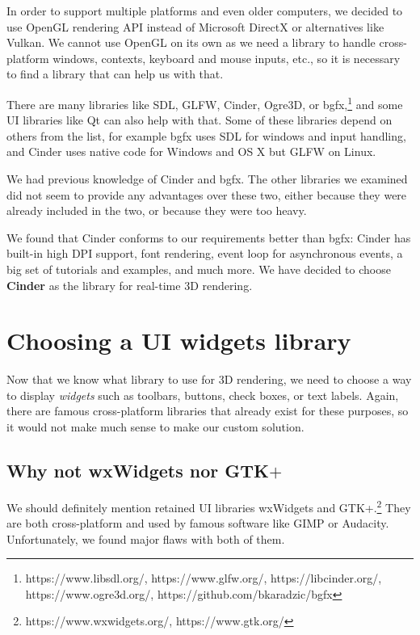 \medskip

In order to support multiple platforms and even older computers, we decided to use OpenGL rendering API instead of Microsoft DirectX or alternatives like Vulkan.
We cannot use OpenGL on its own as we need a library to handle cross-platform windows, contexts, keyboard and mouse inputs, etc., so it is necessary to find a library that can help us with that.

There are many libraries like SDL, GLFW, Cinder, Ogre3D, or bgfx,\footnote{https://www.libsdl.org/, https://www.glfw.org/, https://libcinder.org/, https://www.ogre3d.org/, https://github.com/bkaradzic/bgfx} and some UI libraries like Qt can also help with that.
Some of these libraries depend on others from the list, for example bgfx uses SDL for windows and input handling, and Cinder uses native code for Windows and OS X but GLFW on Linux.

We had previous knowledge of Cinder and bgfx.
The other libraries we examined did not seem to provide any advantages over these two, either because they were already included in the two, or because they were too heavy.

We found that Cinder conforms to our requirements better than bgfx:
Cinder has built-in high DPI support, font rendering, event loop for asynchronous events, a big set of tutorials and examples, and much more.
We have decided to choose \textbf{Cinder} as the library for real-time 3D rendering.

\section{Choosing a UI widgets library}

Now that we know what library to use for 3D rendering, we need to choose a way to display \emph{widgets} such as toolbars, buttons, check boxes, or text labels.
Again, there are famous cross-platform libraries that already exist for these purposes, so it would not make much sense to make our custom solution.

\subsection{Why not wxWidgets nor GTK$+$}

We should definitely mention retained UI libraries wxWidgets and GTK+.\footnote{https://www.wxwidgets.org/, https://www.gtk.org/}
They are both cross-platform and used by famous software like GIMP or Audacity.
Unfortunately, we found major flaws with both of them.

